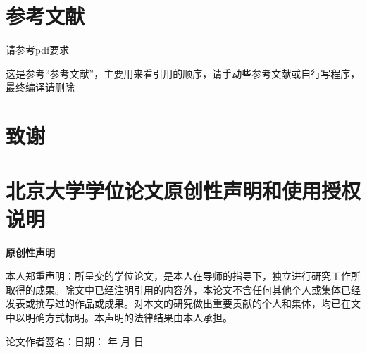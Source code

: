 \documentclass[UTF8,openany,AutoFakeBold,AutoFakeSlant,cs4size]{ctexbook}
\begin{document}
\small
\linespread{1}\selectfont
\chapter*{参考文献}
请参考pdf要求

{
	\fancyhf{}
	\fancyfoot[CO,CE]{~\thepage~}
	\renewcommand{\headrulewidth}{0.7pt}
	\renewcommand{\footrulewidth}{0pt}
}
\fancyhf{}
\fancyfoot[CO,CE]{~\thepage~}
\renewcommand{\headrulewidth}{0.7pt}
\renewcommand{\footrulewidth}{0pt}








这是参考“参考文献”，主要用来看引用的顺序，请手动些参考文献或自行写程序，最终编译请删除
\clearpage




\linespread{1.5}\selectfont
\normalsize
\chapter*{致谢}



{
	\fancyhf{}
	\fancyfoot[CO,CE]{~\thepage~}
	\renewcommand{\headrulewidth}{0.7pt}
	\renewcommand{\footrulewidth}{0pt}
}
\fancyhf{}
\fancyfoot[CO,CE]{~\thepage~}
\renewcommand{\headrulewidth}{0.7pt}
\renewcommand{\footrulewidth}{0pt}




{\linespread{1}\selectfont
\normalsize
\chapter*{北京大学学位论文原创性声明和使用授权说明}}

\begin{center}
\songti \bfseries {}
原创性声明
\end{center}

{
\songti 
本人郑重声明：所呈交的学位论文，是本人在导师的指导下，独立进行研究工作所取得的成果。除文中已经注明引用的内容外，本论文不含任何其他个人或集体已经发表或撰写过的作品或成果。对本文的研究做出重要贡献的个人和集体，均已在文中以明确方式标明。本声明的法律结果由本人承担。

\quad

\hspace*{0.22\linewidth} 论文作者签名：\quad\quad\quad\quad\quad 日期：\quad\quad\; 年\quad \; 月\quad \; 日
}
\end{document}

